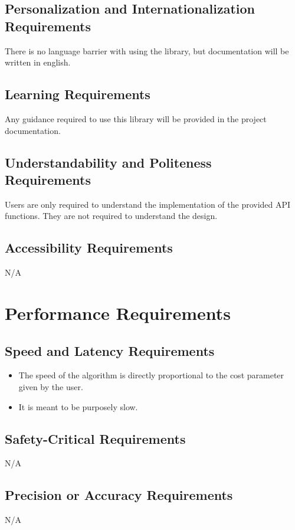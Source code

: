 \documentclass[12pt]{article}
\begin{document}
\subsection {Personalization and Internationalization Requirements}
There is no language barrier with using the library, but documentation will be written in english.

\subsection {Learning Requirements}
Any guidance required to use this library will be provided in the project documentation.

\subsection {Understandability and Politeness Requirements}
Users are only required to understand the implementation of the provided API functions. They are not required to understand the design.

\subsection {Accessibility Requirements}
N/A

\section {Performance Requirements}

\subsection {Speed and Latency Requirements}
\begin{itemize}
	\item The speed of the algorithm is directly proportional to the cost parameter given by the user.
	\item It is meant to be purposely slow.
\end{itemize}

\subsection {Safety-Critical Requirements}
N/A

\subsection {Precision or Accuracy Requirements}
N/A
\end{document}
